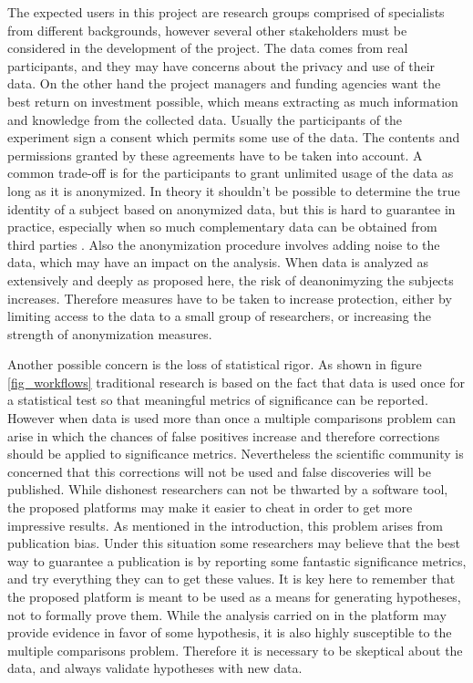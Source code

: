 The expected users in this project are research groups comprised of specialists from different backgrounds, however several other stakeholders must be considered in the development of the project. The data comes from real participants, and they may have concerns about the privacy and use of their data. On the other hand the project managers and funding agencies want the best return on investment possible, which means extracting as much information and knowledge from the collected data. Usually the participants of the experiment sign a consent which permits some use of the data. The contents and permissions granted by these agreements have to be taken into account. A common trade-off is for the participants to grant unlimited usage of the data as long as it is anonymized. In theory it shouldn't be possible to determine the true identity of a subject based on anonymized data, but this is hard to guarantee in practice, especially when so much complementary data can be obtained from third parties \autocite{singel_netflix_2009}. Also the anonymization procedure involves adding noise to the data, which may have an impact on the analysis. When data is analyzed as extensively and deeply as proposed here, the risk of deanonimyzing the subjects increases. Therefore measures have to be taken to increase protection, either by limiting access to the data to a small group of researchers, or increasing the strength of anonymization measures. 

Another possible concern is the loss of statistical rigor. As shown in figure \ref{fig_workflows} traditional research is based on the fact that data is used once for a statistical test so that meaningful metrics of significance can be reported. However when data is used more than once a multiple comparisons problem can arise in which the chances of false positives increase and therefore corrections should be applied to significance metrics. Nevertheless the scientific community is concerned that this corrections will not be used and false discoveries will be published. While dishonest researchers can not be thwarted by a software tool, the proposed platforms may make it easier to cheat in order to get more impressive results. As mentioned in the introduction, this problem arises from publication bias. Under this situation some researchers may believe that the best way to guarantee a publication is by reporting some fantastic significance metrics, and try everything they can to get these values. It is key here to remember that the proposed platform is meant to be used as a means for generating hypotheses, not to formally prove them. While the analysis carried on in the platform may provide evidence in favor of some hypothesis, it is also highly susceptible to the multiple comparisons problem. Therefore it is necessary to be skeptical about the data, and always validate hypotheses with new data.  

